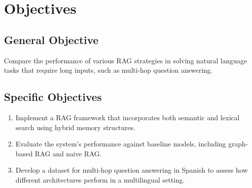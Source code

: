 \section{Objectives}
\label{sec:objectives}

\subsection{General Objective}
Compare the performance of various RAG strategies in solving natural language tasks that require long inputs, such as multi-hop question answering.

\subsection{Specific Objectives}

\begin{enumerate}
    \item Implement a RAG framework that incorporates both semantic and lexical search using hybrid memory structures.
    \item Evaluate the system's performance against baseline models, including graph-based RAG and naive RAG.
    \item Develop a dataset for multi-hop question answering in Spanish to assess how different architectures perform in a multilingual setting.
\end{enumerate}